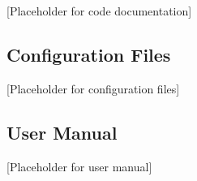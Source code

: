 \documentclass[12pt,a4paper]{article}
\begin{document}
[Placeholder for code documentation]

\subsection{Configuration Files}


[Placeholder for configuration files]

\subsection{User Manual}


[Placeholder for user manual]
\end{document}
